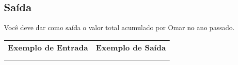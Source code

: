 \subsection*{Saída}

Você deve dar como saída o valor total acumulado por Omar no ano passado.

\begin{flushleft}
\begin{tabularx}{1.01\textwidth}{ | p{6cm} | p{10cm} | }
\hline
\textbf{Exemplo de Entrada} & \textbf{Exemplo de Saída} \\

&

\\
\hline

&

\\
\hline
\end{tabularx}
\end{flushleft}
